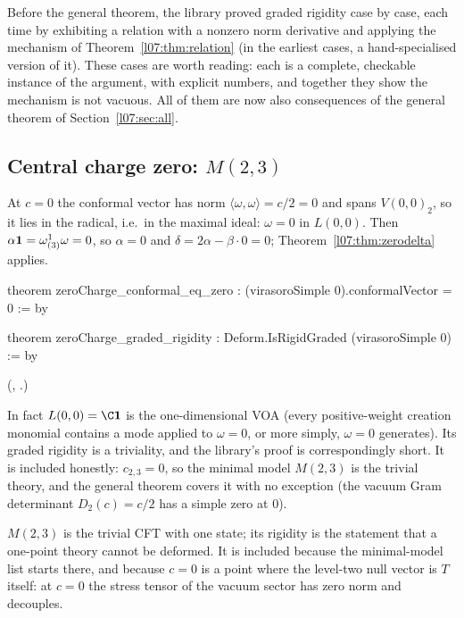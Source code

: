 Before the general theorem, the library proved graded rigidity case by case, each time by exhibiting a
relation with a nonzero norm derivative and applying the mechanism of Theorem~\ref{l07:thm:relation} (in
the earliest cases, a hand-specialised version of it). These cases are worth reading: each is a complete,
checkable instance of the argument, with explicit numbers, and together they show the mechanism is not
vacuous. All of them are now also consequences of the general theorem of Section~\ref{l07:sec:all}.

\subsection{Central charge zero: \texorpdfstring{$M(2,3)$}{M(2,3)}}\label{l07:sec:zero}

At $c = 0$ the conformal vector has norm $\langle\omega,\omega\rangle = c/2 = 0$ and spans $V(0,0)_2$, so it lies in
the radical, i.e.\ in the maximal ideal: $\omega = 0$ in $L(0,0)$. Then $\alpha\mathbf{1} = \omega^1_{(3)}\omega = 0$, so
$\alpha = 0$ and $\delta = 2\alpha - \beta\cdot0 = 0$; Theorem~\ref{l07:thm:zerodelta} applies.
\begin{leancode}
theorem zeroCharge_conformal_eq_zero : (virasoroSimple 0).conformalVector = 0 := by

theorem zeroCharge_graded_rigidity : Deform.IsRigidGraded (virasoroSimple 0) := by
\end{leancode}
(, .)
\begin{dictionary}
In fact $L(0,0) = \C\lsevenvac$ is the one-dimensional VOA (every positive-weight creation monomial contains a
mode applied to $\omega = 0$, or more simply, $\omega = 0$ generates). Its graded rigidity is a triviality, and
the library's proof is correspondingly short. It is included honestly: $c_{2,3} = 0$, so the minimal model
$M(2,3)$ is the trivial theory, and the general theorem covers it with no exception (the vacuum Gram
determinant $D_2(c) = c/2$ has a simple zero at $0$).
\end{dictionary}


\begin{physics}
$M(2,3)$ is the trivial CFT with one state; its rigidity is the statement that a one-point theory cannot be
deformed. It is included because the minimal-model list starts there, and because $c=0$ is a point where the
level-two null vector is $T$ itself: at $c=0$ the stress tensor of the vacuum sector has zero norm and decouples.
\end{physics}

